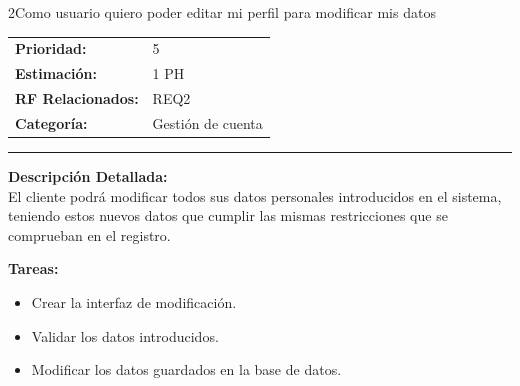 \begin{hu_card}{2}{Como usuario quiero poder editar mi perfil para modificar mis datos}
    \begin{tabularx}{\linewidth}{l X}
        \textbf{Prioridad:}   & 5 \\
        \textbf{Estimación:}  & 1 PH  \\
        \textbf{RF Relacionados:} & REQ2\\
        \textbf{Categoría:} & Gestión de cuenta \\
    \end{tabularx}

    \vspace{2mm}
    \hrule
    \vspace{2mm}

    \textbf{Descripción Detallada:} \\
    El cliente podrá modificar todos sus datos personales introducidos en el sistema, teniendo estos nuevos datos que cumplir las mismas restricciones que se comprueban en el registro.

    \vspace{2mm}
    \textbf{Tareas:}
    \begin{itemize}[noitemsep, topsep=0pt]
        \item Crear la interfaz de modificación.
        \item Validar los datos introducidos.
        \item Modificar los datos guardados en la base de datos.
    \end{itemize}


\end{hu_card}
